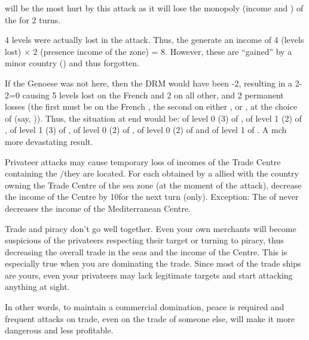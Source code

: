\begin{exemple}
  \FRA will be the most hurt by this attack as it will lose the monopoly
  (income and \VPs) of the \STZ for 2 turns.

  4 levels were actually lost in the attack. Thus, the \corsaire generate an
  income of 4 (levels lost) $\times$ 2 (presence income of the zone) =
  8\ducats. However, these are ``gained'' by a minor country (\paysAlgerie)
  and thus forgotten.
  
  \smallskip

  If the Genoese \FLEET was not here, then the DRM would have been -2,
  resulting in a 2-2=0 causing 5 levels lost on the French \TradeFLEET and 2
  on all other, and 2 permanent losses (the first must be on the French
  \TradeFLEET, the second on either \FRA, \paysGenes or \paysHollande, at the
  choice of \TUR (say, \paysGenes)). Thus, the situation at end would be:
  \TradeFLEET\facemoins of level 0 (3) of \FRA, \TradeFLEET\facemoins of level
  1 (2) of \paysGenes, \TradeFLEET\facemoins of level 1 (3) of \paysHollande,
  \TradeFLEET\facemoins of level 0 (2) of \HIS, \TradeFLEET\facemoins of level
  0 (2) of \VEN and \TradeFLEET\facemoins of level 1 of \TUR. A mch more
  devastating result.
\end{exemple}

\bparag Privateer attacks may cause temporary loss of incomes of the Trade
Centre containing the \STZ/\CTZ they are located.
\bparag For each \textetoile obtained by a \corsaire allied with the country
owning the Trade Centre of the sea zone (at the moment of the attack),
decrease the income of the Centre by 10\ducats for the next turn (only).
\bparag Exception: The \corsaire of  never decreases the
income of the Mediterranean Centre.

\begin{designnote}
  Trade and piracy don't go well together. Even your own merchants will become
  suspicious of the privateers respecting their target or turning to piracy,
  thus decreasing the overall trade in the seas and the income of the
  Centre. This is especially true when you are dominating the trade. Since
  most of the trade ships are yours, even your privateers may lack legitimate
  targets and start attacking anything at sight.

  In other words, to maintain a commercial domination, peace is required and
  frequent attacks on trade, even on the trade of someone else, will make it
  more dangerous and less profitable.
\end{designnote}

